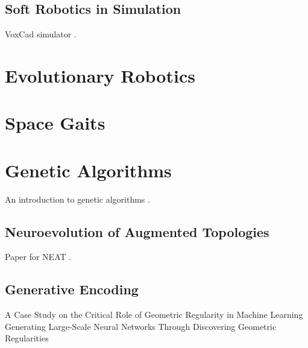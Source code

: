 \subsection{Soft Robotics in Simulation}

VoxCad simulator \cite{hiller2012dynamic}.\\




\section{Evolutionary Robotics}

\cite{lapeyre2011maturational}
\cite{oudeyer2013intrinsically}






\section{Space Gaits}



\section{Genetic Algorithms}
An introduction to genetic algorithms \cite{goldberg1988genetic, goldberg1997genetic}.\\

\cite{woolley2011deleterious}

\cite{lewis1992genetic}









\subsection{Neuroevolution of Augmented Topologies}
Paper for NEAT \cite{stanley2002evolving}.\\







\subsection{Generative Encoding}
A Case Study on the Critical Role of Geometric Regularity in Machine Learning \cite{gauci:aaai08}\\
Generating Large-Scale Neural Networks Through Discovering Geometric Regularities \cite{gauci:gecco07}\\

